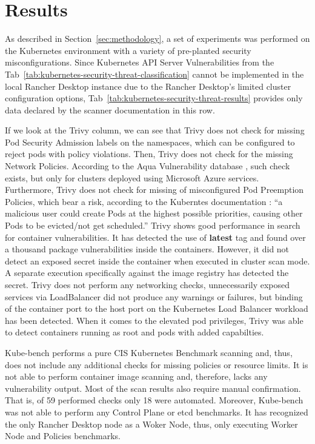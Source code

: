 \chapter{Results}
\label{chap:results}

As described in Section~\ref{sec:methodology}, a set of experiments was performed on the Kubernetes environment with a variety of pre-planted security misconfigurations. Since Kubernetes API Server Vulnerabilities from the Tab~\ref{tab:kubernetes-security-threat-classification} cannot be implemented in the local Rancher Desktop instance due to the Rancher Desktop's limited cluster configuration options, Tab~\ref{tab:kubernetes-security-threat-results} provides only data declared by the scanner documentation in this row.

If we look at the Trivy column, we can see that Trivy does not check for missing Pod Security Admission labels on the namespaces, which can be configured to reject pods with policy violations. Then, Trivy does not check for the missing Network Policies. According to the Aqua Vulnerability database \cite{aqua-vulnerability-database}, such check exists, but only for clusters deployed using Microsoft Azure services. Furthermore, Trivy does not check for missing of misconfigured Pod Preemption Policies, which bear a risk, according to the Kuberntes documentation \cite{pod-security-preemption}: ``a malicious user could create Pods at the highest possible priorities, causing other Pods to be evicted/not get scheduled.'' Trivy shows good performance in search for container vulnerabilities. It has detected the use of \textbf{latest} tag and found over a thousand package vulnerabilities inside the containers. However, it did not detect an exposed secret inside the container when executed in cluster scan mode. A separate execution specifically against the image registry has detected the secret. Trivy does not perform any networking checks, unnecessarily exposed services via LoadBalancer did not produce any warnings or failures, but binding of the container port to the host port on the Kubernetes Load Balancer workload has been detected. When it comes to the elevated pod privileges, Trivy was able to detect containers running as root and pods with added capabilties.

Kube-bench performs a pure CIS Kubernetes Benchmark scanning and, thus, does not include any additional checks for missing policies or resource limits. It is not able to perform container image scanning and, therefore, lacks any vulnerability output. Most of the scan results also require manual confirmation. That is, of 59 performed checks only 18 were automated. Moreover, Kube-bench was not able to perform any Control Plane or etcd benchmarks. It has recognized the only Rancher Desktop node as a Woker Node, thus, only executing Worker Node and Policies benchmarks.

